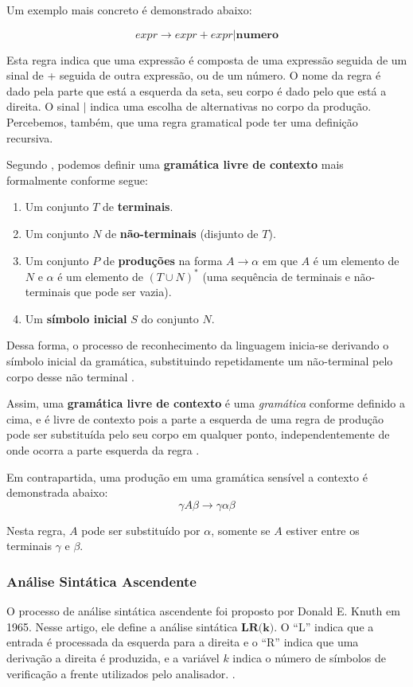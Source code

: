 Um exemplo mais concreto é demonstrado abaixo:

\[
expr \rightarrow expr + expr | \textbf{numero}
\]

Esta regra indica que uma expressão é composta de uma expressão seguida de um
sinal de + seguida de outra expressão, ou de um número. O nome da regra é dado
pela parte que está a esquerda da seta, seu corpo é dado pelo que está a
direita. O sinal \(|\) indica uma escolha de alternativas no corpo da
produção. Percebemos, também, que uma regra gramatical pode ter uma
definição recursiva.

Segundo , podemos definir uma \textbf{gramática livre de
contexto} mais formalmente conforme segue:
\begin{enumerate}
	\item Um conjunto \(T\) de \textbf{terminais}.
	\item Um conjunto \(N\) de \textbf{não-terminais} (disjunto de \(T\)).
	\item Um conjunto \(P\) de \textbf{produções} na forma \(A \rightarrow \alpha\)
				em que \(A\) é um elemento de \(N\) e \(\alpha\) é um elemento de
				\((T \cup N)^*\) (uma sequência de terminais e não-terminais que
				pode ser vazia).
	\item Um \textbf{símbolo inicial} \(S\) do conjunto \(N\).
\end{enumerate}

Dessa forma, o processo de reconhecimento da linguagem inicia-se derivando o
símbolo inicial da gramática, substituindo repetidamente um não-terminal pelo
corpo desse não terminal \cite{new-dragon-pt}.

Assim, uma \textbf{gramática livre de contexto} é uma \emph{gramática}
conforme definido a cima, e é livre de contexto pois a parte a esquerda de uma
regra de produção pode ser substituída pelo seu corpo em qualquer ponto,
independentemente de onde ocorra a parte esquerda da regra \cite{louden97-pt}.

Em contrapartida, uma produção em uma gramática sensível a contexto é demonstrada
abaixo:
\[
	\gamma{}A{}\beta \rightarrow \gamma\alpha\beta
\]

Nesta regra, \(A\) pode ser substituído por \(\alpha\), somente se
\(A\) estiver entre os terminais \(\gamma\) e \(\beta\).

\subsubsection{Análise Sintática Ascendente}
\label{sec:asc_syntax_analisys}
O processo de análise sintática ascendente foi proposto por Donald E. Knuth
em 1965. Nesse artigo, ele define a análise sintática $\textbf{LR(k)}$. O
``L'' indica que a entrada é processada da esquerda para a direita e o ``R''
indica que uma derivação a direita é produzida, e a variável $k$ indica
o número de símbolos de verificação a frente utilizados pelo analisador.
\cite{louden97-pt}.

